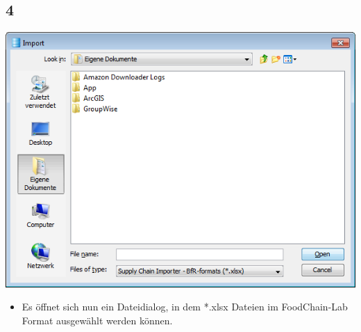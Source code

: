 \documentclass{beamer}
\begin{document}
\subsection{4}
\begin{frame}
	\begin{center}
  		\includegraphics[height=0.6\textheight]{4.png}
	\end{center}
	\begin{itemize}
		\item Es öffnet sich nun ein Dateidialog, in dem *.xlsx Dateien im FoodChain-Lab Format ausgewählt werden können.
	\end{itemize}
\end{frame}
\end{document}
